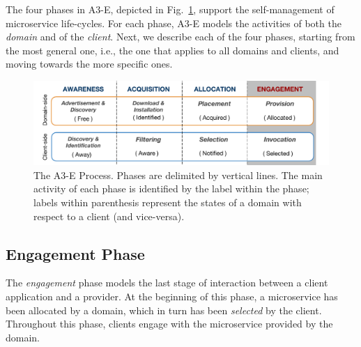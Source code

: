 The four phases in A3-E, depicted in Fig.~\ref{fig:A3-E-process}, support the self-management of microservice life-cycles. For each phase, A3-E models the activities of both the \textit{domain} and of the \textit{client}. 
Next, we describe each of the four phases, starting from the most general one, i.e., the one that applies to all domains and clients, and moving towards the more specific ones.

\begin{figure}[tbp]
	\includegraphics[width=1\textwidth]{figs/A3-E-process}
	\caption{The A3-E Process. Phases are delimited by vertical lines. The main activity of each phase is identified by the label within the phase; labels within parenthesis represent the states of a domain with respect to a client (and vice-versa).}
	\label{fig:A3-E-process}
\end{figure}



\subsection*{Engagement Phase}\label{sec:A3-E-engagement}

The \textit{engagement} phase models the last stage of interaction between a client application and a provider. At the beginning of this phase, a microservice has been allocated by a domain, which in turn has been \textit{selected} by the client. Throughout this phase, clients engage with the microservice provided by the domain.

